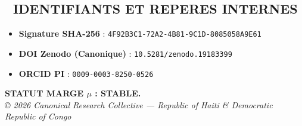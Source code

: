 ﻿\documentclass[a4paper,12pt]{article}
\begin{document}
\bigskip



\begin{tcolorbox}[colback=white,colframe=black!75!white]

\section*{📜 IDENTIFIANTS ET REPERES INTERNES}

\begin{itemize}

 \item \textbf{Signature SHA-256} : \texttt{4F92B3C1-72A2-4B81-9C1D-8085058A9E61}

 \item \textbf{DOI Zenodo (Canonique)} : \texttt{10.5281/zenodo.19183399}

 \item \textbf{ORCID PI} : \texttt{0009-0003-8250-0526}

\end{itemize}

\end{tcolorbox}



\vfill

\centering

\textbf{STATUT MARGE $\mu$ : STABLE.} \\

\textit{© 2026 Canonical Research Collective — Republic of Haiti \& Democratic Republic of Congo}
\end{document}
